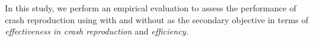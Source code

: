 In this study, we perform an empirical evaluation to assess the performance of crash reproduction using \integ with and without \bbc as the secondary objective in terms of \textit{effectiveness in crash reproduction} and \textit{efficiency}.






